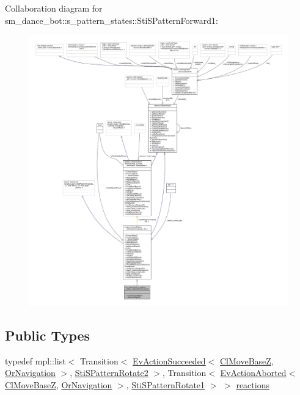 Collaboration diagram for sm\+\_\+dance\+\_\+bot\+:\+:s\+\_\+pattern\+\_\+states\+:\+:Sti\+S\+Pattern\+Forward1\+:
\nopagebreak
\begin{figure}[H]
\begin{center}
\leavevmode
\includegraphics[width=350pt]{structsm__dance__bot_1_1s__pattern__states_1_1StiSPatternForward1__coll__graph}
\end{center}
\end{figure}
\subsection*{Public Types}
\begin{DoxyCompactItemize}
\item 
typedef mpl\+::list$<$ Transition$<$ \hyperlink{structsmacc_1_1default__events_1_1EvActionSucceeded}{Ev\+Action\+Succeeded}$<$ \hyperlink{classcl__move__base__z_1_1ClMoveBaseZ}{Cl\+Move\+BaseZ}, \hyperlink{classsm__dance__bot_1_1OrNavigation}{Or\+Navigation} $>$, \hyperlink{structsm__dance__bot_1_1s__pattern__states_1_1StiSPatternRotate2}{Sti\+S\+Pattern\+Rotate2} $>$, Transition$<$ \hyperlink{structsmacc_1_1default__events_1_1EvActionAborted}{Ev\+Action\+Aborted}$<$ \hyperlink{classcl__move__base__z_1_1ClMoveBaseZ}{Cl\+Move\+BaseZ}, \hyperlink{classsm__dance__bot_1_1OrNavigation}{Or\+Navigation} $>$, \hyperlink{structsm__dance__bot_1_1s__pattern__states_1_1StiSPatternRotate1}{Sti\+S\+Pattern\+Rotate1} $>$ $>$ \hyperlink{structsm__dance__bot_1_1s__pattern__states_1_1StiSPatternForward1_a0f2c2bef4b7c495986680947b3f76b6f}{reactions}
\end{DoxyCompactItemize}
